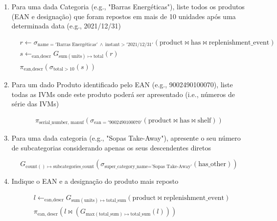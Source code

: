 \documentclass[12pt,a4paper]{article}
\newcommand{\op}{\text}
\begin{document}
  \begin{enumerate}
    \item Para uma dada Categoria (e.g., "Barras Energéticas"), liste todos os produtos (EAN e designação) que foram repostos em mais de 10 unidades após uma determinada data (e.g., 2021/12/31)

    \[
      \begin{aligned}
        &r \leftarrow \sigma_{\op{name}='\text{Barras Energéticas}'~\land~\op{instant} > '\text{2021/12/31}'}(\op{product} \bowtie \op{has} \bowtie \op{replenishment\_event})\\
        &s \leftarrow _{\op{ean}, \op{descr}} G_{\op{sum}(\op{units}) \mapsto \op{total}}(r)\\
        &\pi_{\op{ean}, \op{descr}} \left(\sigma_{\op{total} > 10}\left(s\right)\right)
      \end{aligned}
    \]

    \item Para um dado Produto identificado pelo EAN (e.g., 9002490100070), liste todas as IVMs onde este produto poderá ser apresentado (i.e., números de série das IVMs)

    \[
      \begin{aligned}
        \pi_{\op{serial\_number, manuf}}\left(\sigma_{\op{ean}='9002490100070'}\left(\op{product} \bowtie \op{has} \bowtie \op{shelf}\right)\right)
      \end{aligned}
    \]

    \item Para uma dada categoria (e.g., "Sopas Take-Away"), apresente o seu número de subcategorias considerando apenas os seus descendentes diretos

    \[
      G_{\op{count}()\mapsto \op{subcategories\_count}}\left(\sigma_{\op{super\_category\_name}=\text{'Sopas Take-Away'}}(\op{has\_other})\right)
    \]

    \item Indique o EAN e a designação do produto mais reposto

    \[
      \begin{aligned}
        &l \leftarrow _{\op{ean,descr}} G_{\op{sum}(\op{units})\mapsto \op{total\_sum}}(\op{product} \bowtie \op{replenishment\_event})\\
        &\pi_{\op{ean},~\op{descr}}\left(
          l \bowtie \left( G_{\op{max}(\op{total\_sum})\mapsto \op{total\_sum}}(l)\right)
        \right)
        \end{aligned}
    \]
  \end{enumerate}
  
\end{document}
